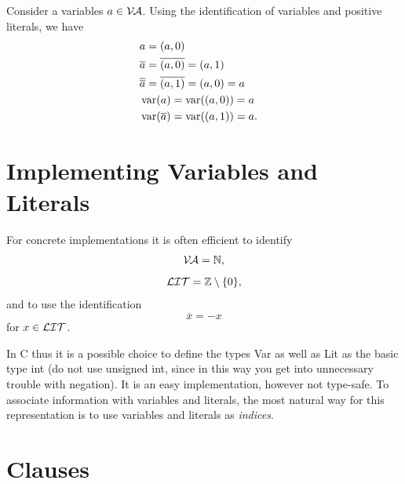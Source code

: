 \documentclass[12pt]{book}
\begin{document}
\begin{examp}\label{}
      Consider a variables $a\in  \mathcal{V\hspace{-0.1em}A}$. Using the identification of variables and positive literals, we have
      \begin{eqnarray*}
            &a = (a,0)& \\
            &\overline{a} = \overline{(a,0)} = (a,1)&\\
            &\overline{\overline{a}} = \overline{(a,1)} = (a,0) = a&\\
            &\operatorname{var}(a) = \operatorname{var}((a,0)) = a& \\
            &\operatorname{var}(\overline{a}) = \operatorname{var}((a,1)) = a. &
      \end{eqnarray*}
\end{examp}
\section{Implementing Variables and Literals}
\label{sec:varlit}
For concrete implementations it is often efficient to identify
$$\mathcal{V\hspace{-0.1em}A} = \mathbb{N},$$
$$\mathcal{LIT} = \mathbb{Z}\setminus \{0\},$$ 
and to use the identification
$$\overline{x} = -x$$
for $x \in \mathcal{LIT}$.

In C thus it is a possible choice to define the types Var as well as Lit as the basic type int (do not use unsigned int, since in this 
way you get into unnecessary trouble with negation). It is an easy implementation, however not type-safe.
To associate information with variables and literals, the most natural way for this representation is to use variables and literals as 
\textit{indices}.
\section{Clauses}
\label{sec:Clauses}
\end{document}
